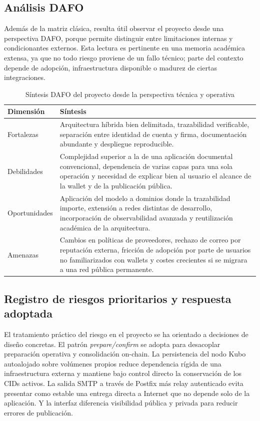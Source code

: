 \documentclass[11pt, a4paper]{article}
\begin{document}
\subsection{Análisis DAFO}

Además de la matriz clásica, resulta útil observar el proyecto desde una perspectiva DAFO, porque permite distinguir entre limitaciones internas y condicionantes externos. Esta lectura es pertinente en una memoria académica extensa, ya que no todo riesgo proviene de un fallo técnico; parte del contexto depende de adopción, infraestructura disponible o madurez de ciertas integraciones.

\begin{table}[H]
    \centering
    \small
    \begin{tabular}{|p{3cm}|p{10.5cm}|}
    \hline
    \textbf{Dimensión} & \textbf{Síntesis} \\
    \hline
    Fortalezas & Arquitectura híbrida bien delimitada, trazabilidad verificable, separación entre identidad de cuenta y firma, documentación abundante y despliegue reproducible. \\
    \hline
    Debilidades & Complejidad superior a la de una aplicación documental convencional, dependencia de varias capas para una sola operación y necesidad de explicar bien al usuario el alcance de la wallet y de la publicación pública. \\
    \hline
    Oportunidades & Aplicación del modelo a dominios donde la trazabilidad importe, extensión a redes distintas de desarrollo, incorporación de observabilidad avanzada y reutilización académica de la arquitectura. \\
    \hline
    Amenazas & Cambios en políticas de proveedores, rechazo de correo por reputación externa, fricción de adopción por parte de usuarios no familiarizados con wallets y costes crecientes si se migrara a una red pública permanente. \\
    \hline
    \end{tabular}
    \caption{Síntesis DAFO del proyecto desde la perspectiva técnica y operativa}
    \label{tab:dafo-memoria}
\end{table}

\subsection{Registro de riesgos prioritarios y respuesta adoptada}

El tratamiento práctico del riesgo en el proyecto se ha orientado a decisiones de diseño concretas. El patrón \textit{prepare/confirm} se adopta para desacoplar preparación operativa y consolidación on-chain. La persistencia del nodo Kubo autoalojado sobre volúmenes propios reduce dependencia rígida de una infraestructura externa y mantiene bajo control directo la conservación de los CIDs activos. La salida SMTP a través de Postfix más relay autenticado evita presentar como estable una entrega directa a Internet que no depende solo de la aplicación. Y la interfaz diferencia visibilidad pública y privada para reducir errores de publicación.
\end{document}
